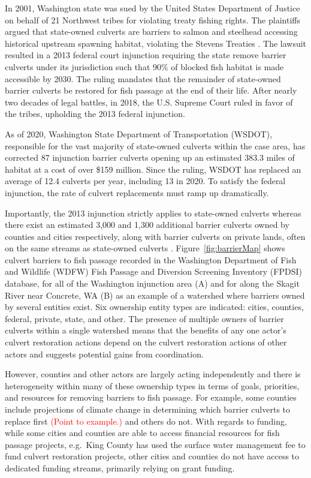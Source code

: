 \documentclass[12pt]{elsarticle}
\begin{document}
 In 2001, Washington state was sued by the United States Department of Justice on behalf of 21 Northwest tribes for violating treaty fishing rights. The plaintiffs argued that state-owned culverts are barriers to salmon and steelhead accessing historical upstream spawning habitat, violating the Stevens Treaties \citep{hickey2018highway}. The lawsuit resulted in a 2013 federal court injunction requiring the state remove barrier culverts under its jurisdiction such that 90\% of blocked fish habitat is made accessible by 2030. The ruling mandates that the remainder of state-owned barrier culverts be restored for fish passage at the end of their life. After nearly two decades of legal battles, in 2018, the U.S. Supreme Court ruled in favor of the tribes, upholding the 2013 federal injunction. 

As of 2020, Washington State Department of Transportation (WSDOT), responsible for the vast majority of state-owned culverts within the case area, has corrected 87 injunction barrier culverts opening up an estimated 383.3 miles of habitat at a cost of over \$159 million. Since the ruling, WSDOT has replaced an average of 12.4 culverts per year, including 13 in 2020. To satisfy the federal injunction, the rate of culvert replacements must ramp up dramatically. 

Importantly, the 2013 injunction strictly applies to state-owned culverts whereas there exist an estimated 3,000 and 1,300 additional barrier culverts owned by counties and cities respectively, along with barrier culverts on private lands, often on the same streams as state-owned culverts \citep{brown2019coming}. Figure~\ref{fig:barrierMap} shows culvert barriers to fish passage recorded in the Washington Department of Fish and Wildlife (WDFW) Fish Passage and Diversion Screening Inventory (FPDSI) database, for all of the Washington injunction area (A) and for along the Skagit River near Concrete, WA (B) as an example of a watershed where barriers owned by several entities exist. Six ownership entity types are indicated: cities, counties, federal, private, state, and other. The presence of multiple owners of barrier culverts within a single watershed means that the benefits of any one actor's culvert restoration actions depend on the culvert restoration actions of other actors and suggests potential gains from coordination. 

However, counties and other actors are largely acting independently and there is heterogeneity within many of these ownership types in terms of goals, priorities, and resources for removing barriers to fish passage. For example, some counties include projections of climate change in determining which barrier culverts to replace first \textcolor{red}{(Point to example.)} and others do not. With regards to funding, while some cities and counties are able to access financial resources for fish passage projects, e.g.\ King County has used the surface water management fee to fund culvert restoration projects, other cities and counties do not have access to dedicated funding streams, primarily relying on grant funding.  
\end{document}

